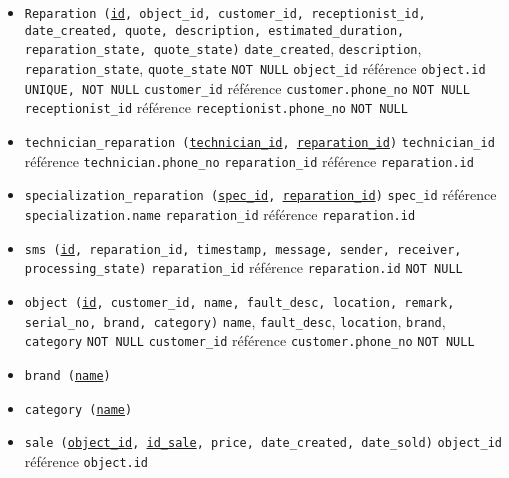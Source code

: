 \documentclass{article}
\newcommand{\ul}{\underline}
\newcommand{\ttt}{\texttt}
\begin{document}
\begin{itemize}
    \item \ttt{Reparation (\ul{id}, object\_id, customer\_id, receptionist\_id, date\_created, quote, description, estimated\_duration, reparation\_state, quote\_state)}
    \subitem \ttt{date\_created}, \ttt{description}, \ttt{reparation\_state}, \ttt{quote\_state} \ttt{NOT NULL}
    \subitem \ttt{object\_id} référence \ttt{object.id} \ttt{UNIQUE, NOT NULL}
    \subitem \ttt{customer\_id} référence \ttt{customer.phone\_no} \ttt{NOT NULL}
    \subitem \ttt{receptionist\_id} référence \ttt{receptionist.phone\_no} \ttt{NOT NULL}

    \item \ttt{technician\_reparation (\ul{technician\_id}, \ul{reparation\_id})}
    \subitem \ttt{technician\_id} référence \ttt{technician.phone\_no} 
    \subitem \ttt{reparation\_id} référence \ttt{reparation.id}

    \item \ttt{specialization\_reparation (\ul{spec\_id}, \ul{reparation\_id})}
    \subitem \ttt{spec\_id} référence \ttt{specialization.name}
    \subitem \ttt{reparation\_id} référence \ttt{reparation.id}

    \item \ttt{sms (\ul{id}, reparation\_id, timestamp, message, sender, receiver, processing\_state)}
    \subitem \ttt{reparation\_id} référence \ttt{reparation.id} \ttt{NOT NULL}

    \item \ttt{object (\ul{id}, customer\_id, name, fault\_desc, location, remark, serial\_no, brand, category)}
    \subitem \ttt{name}, \ttt{fault\_desc}, \ttt{location}, \ttt{brand}, \ttt{category} \ttt{NOT NULL}
    \subitem \ttt{customer\_id} référence \ttt{customer.phone\_no} \ttt{NOT NULL}

    \item \ttt{brand (\ul{name})}
    \item \ttt{category (\ul{name})}
    \item \ttt{sale (\ul{object\_id}, \ul{id\_sale}, price, date\_created, date\_sold)}
    \subitem \ttt{object\_id} référence \ttt{object.id}

\end{itemize}


\pagebreak
\end{document}
